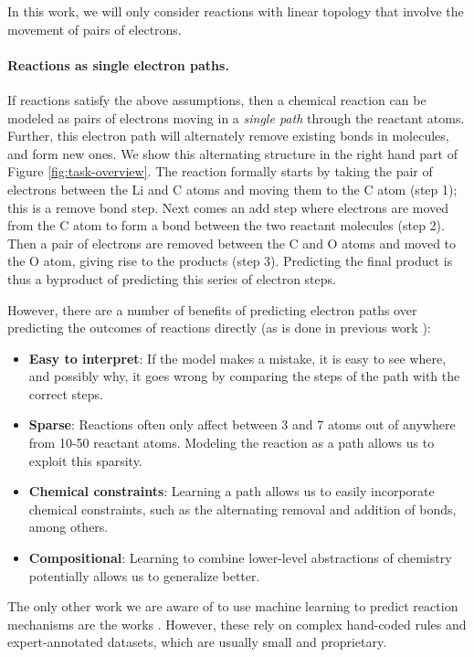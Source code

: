 In this work, we will only consider reactions with linear topology that involve the movement of pairs of electrons.



\vspace{-0.15cm}
\paragraph{Reactions as single electron paths.}
If reactions satisfy the above assumptions, then a chemical reaction can be modeled as pairs of electrons moving in a \emph{single path} through the reactant atoms. 
Further, this electron path will alternately remove existing bonds in molecules, and form new ones. We show this alternating structure in the right hand part of Figure \ref{fig:task-overview}. 
The reaction formally starts by taking the pair of electrons between the Li and C atoms and moving them to the C atom (step 1); this is a remove bond step. 
Next comes an add step where electrons are moved from the C atom to form a bond between the two reactant molecules (step 2).
Then a pair of electrons are removed between the C and O atoms and moved to the O atom, giving rise to the products (step 3). 
Predicting the final product is thus a byproduct of predicting this series of electron steps.

However, there are a number of benefits of predicting electron paths over predicting the outcomes of reactions directly (as is done in previous work \cite{jin2017predicting,schwaller2017found}):
\begin{itemize}
\item \textbf{Easy to interpret}: If the model makes a mistake, it is easy to see where, and possibly why, it goes wrong by comparing the steps of the path with the correct steps.
\item \textbf{Sparse}: Reactions often only affect between 3 and 7 atoms out of anywhere from 10-50 reactant atoms. Modeling the reaction as a path allows us to exploit this sparsity.
\item \textbf{Chemical constraints}: Learning a path allows us to easily incorporate chemical constraints, such as the alternating removal and addition of bonds, among others.
\item \textbf{Compositional}: Learning to combine lower-level abstractions of chemistry potentially allows us to generalize better.
\end{itemize}
The only other work we are aware of to use machine learning to predict reaction mechanisms are the works \cite{kayala2011learning,kayala2012reactionpredictor}. However,
these rely on complex hand-coded rules and expert-annotated datasets, which are usually small and proprietary.
